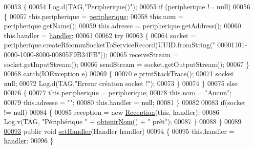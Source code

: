 \begin{DoxyCode}
00053     \{
00054         Log.d(TAG,\textcolor{stringliteral}{"Peripherique()"});
00055         \textcolor{keywordflow}{if} (peripherique != null)
00056         \{
00057             this.peripherique = \hyperlink{classcom_1_1example_1_1ekawa_1_1_peripherique_ab509bd2180c53845197423813a97f025}{peripherique};
00058             this.nom = peripherique.getName();
00059             this.adresse = peripherique.getAddress();
00060             this.handler = \hyperlink{classcom_1_1example_1_1ekawa_1_1_peripherique_ab6a0c0cae2eb087315d0d04d1cf6c3dc}{handler};
00061 
00062             \textcolor{keywordflow}{try}
00063             \{
00064                 socket = peripherique.createRfcommSocketToServiceRecord(UUID.fromString(\textcolor{stringliteral}{"
      00001101-0000-1000-8000-00805F9B34FB"}));
00065                 receiveStream = socket.getInputStream();
00066                 sendStream = socket.getOutputStream();
00067             \}
00068             \textcolor{keywordflow}{catch}(IOException e)
00069             \{
00070                 e.printStackTrace();
00071                 socket = null;
00072                 Log.d(TAG,\textcolor{stringliteral}{"Erreur création socket !"});
00073             \}
00074         \}
00075         \textcolor{keywordflow}{else}
00076         \{
00077             this.peripherique = \hyperlink{classcom_1_1example_1_1ekawa_1_1_peripherique_ab509bd2180c53845197423813a97f025}{peripherique};
00078             this.nom = \textcolor{stringliteral}{"Aucun"};
00079             this.adresse = \textcolor{stringliteral}{""};
00080             this.handler = null;
00081         \}
00082 
00083         \textcolor{keywordflow}{if}(socket != null)
00084         \{
00085             reception = \textcolor{keyword}{new} \hyperlink{classcom_1_1example_1_1ekawa_1_1_reception}{Reception}(\textcolor{keyword}{this}, handler);
00086             Log.v(TAG, \textcolor{stringliteral}{"Périphérique "} + \hyperlink{classcom_1_1example_1_1ekawa_1_1_peripherique_ad54cfafe03dfcf18cbd9b20602c4d86e}{obtenirNom}() + \textcolor{stringliteral}{" prêt"});
00087         \}
00088     \}
00089 
\hyperlink{classcom_1_1example_1_1ekawa_1_1_peripherique_a2cfa1b391efb3f2e7a78e761e965e7e3}{00093}     \textcolor{keyword}{public} \textcolor{keywordtype}{void} \hyperlink{classcom_1_1example_1_1ekawa_1_1_peripherique_a2cfa1b391efb3f2e7a78e761e965e7e3}{setHandler}(Handler handler)
00094     \{
00095         this.handler = \hyperlink{classcom_1_1example_1_1ekawa_1_1_peripherique_ab6a0c0cae2eb087315d0d04d1cf6c3dc}{handler};
00096     \}

\end{DoxyCode}
